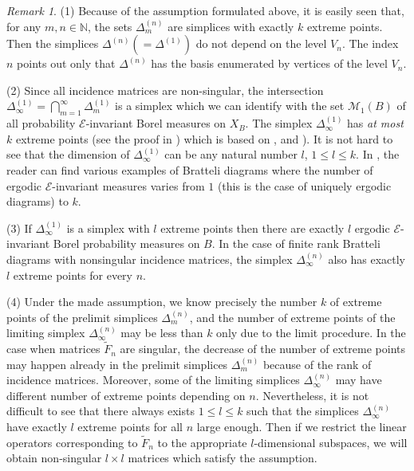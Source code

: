\documentclass[11pt, english, reqno]{amsart}
\theoremstyle{definition}
\theoremstyle{remark}
\newtheorem{remark}[defin]{Remark}
\theoremstyle{plain}
\def\tl{\widetilde}
\numberwithin{equation}{section}
\begin{document}
\begin{remark}
(1) Because of the  assumption formulated above, it is easily seen that, for
any $m, n \in \mathbb{N}$, the sets $\Delta_m^{(n)}$ are simplices with
 exactly $k$ extreme points.
 Then the simplices $\Delta^{(n)} (=\Delta^{(1)})$  do not depend
 on the level $V_n$. The index $n$ points out only that $\Delta^{(n)}$ has
  the  basis enumerated by vertices of the level $V_n$.  

(2) Since all incidence matrices are non-singular, the intersection
$\Delta^{(1)}_{\infty} =
 \bigcap_{m=1}^{\infty} \Delta_m^{(1)}$ is a simplex which we can
  identify with the set $\mathcal{M}_1(B)$ of all probability
  $\mathcal{E}$-invariant Borel measures on $X_B$. The simplex
  $\Delta^{(1)}_{\infty}$ has \textit{at most} $k$ extreme points (see the
  proof in \cite{BezuglyiKwiatkowskiMedynetsSolomyak2013}) which is
  based on  \cite{Phelps2001, Pullman1971}, and
   \cite{BezuglyiKwiatkowskiMedynetsSolomyak2010}).
It is not hard to see that the dimension of $\Delta^{(1)}_{\infty}$ can be
 any natural number $ l$, $1 \leq l \leq k$.
In \cite{BezuglyiKwiatkowskiMedynetsSolomyak2013}, the reader can find
various examples of Bratteli  diagrams where the number of ergodic
$\mathcal E$-invariant  measures varies from $1$ (this is the case of
uniquely ergodic   diagrams) to $k$.

 (3) If $\Delta_{\infty}^{(1)}$ is a simplex with $l$ extreme points then there are
 exactly $l$ ergodic $\mathcal E$-invariant Borel probability
 measures on $B$. In the case of finite rank Bratteli diagrams with
  nonsingular incidence matrices, the simplex $\Delta^{(n)}_\infty$
   also has exactly $l$ extreme points for every $n$.

(4) Under the made assumption, we know precisely the number $k$ of extreme points of the prelimit simplices $\Delta_m^{(n)}$, and the number of extreme points of the limiting simplex $\Delta^{(n)}_\infty$ may be less than $k$ only due to the limit procedure. In the case when matrices $\tl F_n$ are singular, the decrease of the number of extreme points may happen already in the prelimit simplices $\Delta_m^{(n)}$ because of the rank of incidence matrices. Moreover, some of the limiting simplices $\Delta^{(n)}_\infty$ may have different number of extreme points depending on $n$. Nevertheless, it is not difficult to see that there always exists $1 \leq l \leq k$ such that the simplices $\Delta^{(n)}_\infty$ have exactly $l$ extreme points for all $n$ large enough. Then if we restrict the linear operators corresponding to $\tl F_n$ to the appropriate $l$-dimensional subspaces, we will obtain non-singular $l \times l$ matrices which satisfy the assumption.


\end{remark}
\end{document}
